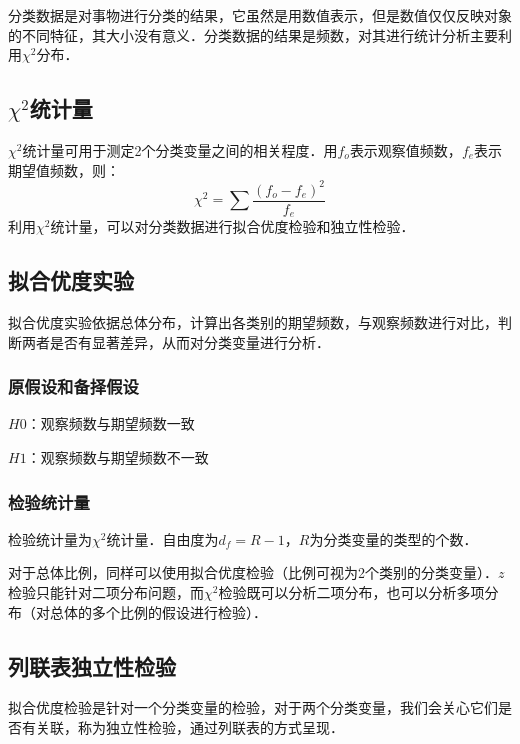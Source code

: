 分类数据是对事物进行分类的结果，它虽然是用数值表示，但是数值仅仅反映对象的不同特征，其大小没有意义．分类数据的结果是频数，对其进行统计分析主要利用$\chi^2$分布．
\subsection{$\chi^2$统计量}
$\chi^2$统计量可用于测定2个分类变量之间的相关程度．用$f_o$表示观察值频数，$f_e$表示期望值频数，则：
\begin{equation}
\chi^2 =  \sum \frac {(f_o-f_e)^2}{f_e}
\end{equation}
利用$\chi^2$统计量，可以对分类数据进行拟合优度检验和独立性检验．
\subsection{拟合优度实验}
拟合优度实验依据总体分布，计算出各类别的期望频数，与观察频数进行对比，判断两者是否有显著差异，从而对分类变量进行分析．
\begin{example}{}
\subsubsection{原假设和备择假设}
$H0$：观察频数与期望频数一致

$H1$：观察频数与期望频数不一致
\subsubsection{检验统计量}
检验统计量为$\chi^2$统计量．自由度为$d_f = R-1$，$R$为分类变量的类型的个数．
\end{example}

对于总体比例，同样可以使用拟合优度检验（比例可视为2个类别的分类变量）．$z$检验只能针对二项分布问题，而$\chi^2$检验既可以分析二项分布，也可以分析多项分布（对总体的多个比例的假设进行检验）．

\subsection{列联表独立性检验}
拟合优度检验是针对一个分类变量的检验，对于两个分类变量，我们会关心它们是否有关联，称为独立性检验，通过列联表的方式呈现．
